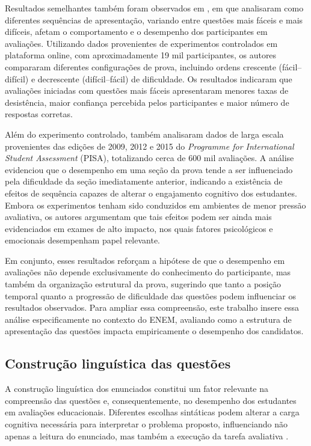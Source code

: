 \documentclass[a4paper,10pt, twocolumn]{article}
\begin{document}
Resultados semelhantes também foram observados em \textcite{Anaya2023}, em que analisaram como diferentes sequências de apresentação, variando entre questões mais fáceis e mais difíceis, afetam o comportamento e o desempenho dos participantes em avaliações. Utilizando dados provenientes de experimentos controlados em plataforma online, com aproximadamente 19 mil participantes, os autores compararam diferentes configurações de prova, incluindo ordens crescente (fácil–difícil) e decrescente (difícil–fácil) de dificuldade. Os resultados indicaram que avaliações iniciadas com questões mais fáceis apresentaram menores taxas de desistência, maior confiança percebida pelos participantes e maior número de respostas corretas.

Além do experimento controlado, \textcite{Anaya2023} também analisaram dados de larga escala provenientes das edições de 2009, 2012 e 2015 do \textit{Programme for International Student Assessment} (PISA), totalizando cerca de 600 mil avaliações. A análise evidenciou que o desempenho em uma seção da prova tende a ser influenciado pela dificuldade da seção imediatamente anterior, indicando a existência de efeitos de sequência capazes de alterar o engajamento cognitivo dos estudantes. Embora os experimentos tenham sido conduzidos em ambientes de menor pressão avaliativa, os autores argumentam que tais efeitos podem ser ainda mais evidenciados em exames de alto impacto, nos quais fatores psicológicos e emocionais desempenham papel relevante.

Em conjunto, esses resultados reforçam a hipótese de que o desempenho em avaliações não depende exclusivamente do conhecimento do participante, mas também da organização estrutural da prova, sugerindo que tanto a posição temporal quanto a progressão de dificuldade das questões podem influenciar os resultados observados. Para ampliar essa compreensão, este trabalho insere essa análise especificamente no contexto do ENEM, avaliando como a estrutura de apresentação das questões impacta empiricamente o desempenho dos candidatos.

\subsection{Construção linguística das questões}

A construção linguística dos enunciados constitui um fator relevante na compreensão das questões e, consequentemente, no desempenho dos estudantes em avaliações educacionais. Diferentes escolhas sintáticas podem alterar a carga cognitiva necessária para interpretar o problema proposto, influenciando não apenas a leitura do enunciado, mas também a execução da tarefa avaliativa \cite{correia2004complexidade,Caldwell2013}.
\end{document}
